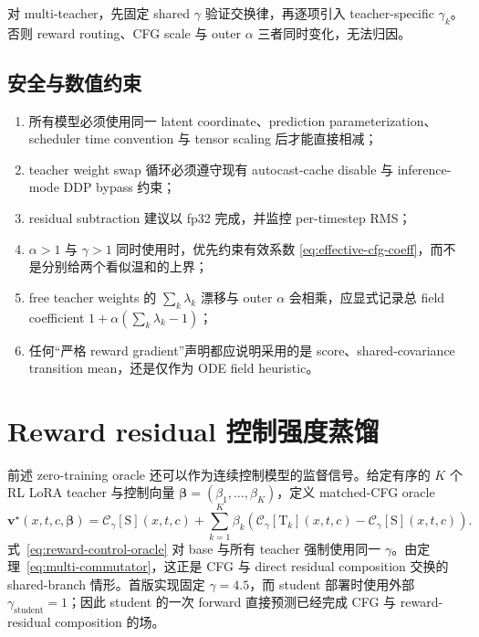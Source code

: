 \documentclass[11pt,a4paper]{article}
\newcommand{\C}{\mathcal{C}}
\newcommand{\vfield}{\bm{v}}
\newcommand{\student}{\mathrm{S}}
\newcommand{\teacher}{\mathrm{T}}
\theoremstyle{definition}
\theoremstyle{plain}
\begin{document}
对 multi-teacher，先固定 shared $\gamma$ 验证交换律，再逐项引入
teacher-specific $\gamma_k$。否则 reward routing、CFG scale 与 outer
$\alpha$ 三者同时变化，无法归因。

\subsection{安全与数值约束}

\begin{enumerate}[leftmargin=1.6em]
  \item 所有模型必须使用同一 latent coordinate、prediction parameterization、
  scheduler time convention 与 tensor scaling 后才能直接相减；
  \item teacher weight swap 循环必须遵守现有 autocast-cache disable 与
  inference-mode DDP bypass 约束；
  \item residual subtraction 建议以 fp32 完成，并监控 per-timestep RMS；
  \item $\alpha>1$ 与 $\gamma>1$ 同时使用时，优先约束有效系数
  \eqref{eq:effective-cfg-coeff}，而不是分别给两个看似温和的上界；
  \item free teacher weights 的 $\sum_k\lambda_k$ 漂移与 outer $\alpha$
  会相乘，应显式记录总 field coefficient
  $1+\alpha(\sum_k\lambda_k-1)$；
  \item 任何``严格 reward gradient''声明都应说明采用的是 score、shared-covariance
  transition mean，还是仅作为 ODE field heuristic。
\end{enumerate}

\section{Reward residual 控制强度蒸馏}
\label{sec:reward-control-distillation}

前述 zero-training oracle 还可以作为连续控制模型的监督信号。给定有序的
$K$ 个 RL LoRA teacher 与控制向量
$\bm\beta=(\beta_1,\ldots,\beta_K)$，定义 matched-CFG oracle
\begin{equation}
  \vfield^\star(x,t,c,\bm\beta)
  =
  \C_{\gamma}[\student](x,t,c)
  +
  \sum_{k=1}^{K}\beta_k
  \left(
    \C_{\gamma}[\teacher_k](x,t,c)
    -
    \C_{\gamma}[\student](x,t,c)
  \right).
  \label{eq:reward-control-oracle}
\end{equation}
式~\eqref{eq:reward-control-oracle} 对 base 与所有 teacher 强制使用同一
$\gamma$。由定理~\ref{eq:multi-commutator}，这正是 CFG 与 direct residual
composition 交换的 shared-branch 情形。首版实现固定 $\gamma=4.5$，而 student
部署时使用外部 $\gamma_{\mathrm{student}}=1$；因此 student 的一次 forward
直接预测已经完成 CFG 与 reward-residual composition 的场。
\end{document}
